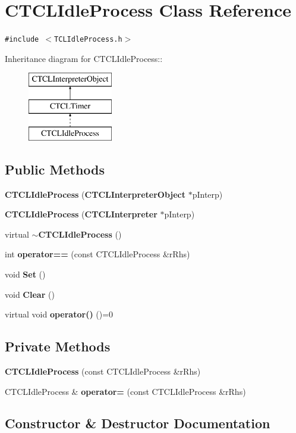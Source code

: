 \section{CTCLIdle\-Process  Class Reference}
\label{classCTCLIdleProcess}
{\tt \#include $<$TCLIdle\-Process.h$>$}

Inheritance diagram for CTCLIdle\-Process::\begin{figure}[H]
\begin{center}
\leavevmode
\includegraphics[height=3cm]{classCTCLIdleProcess}
\end{center}
\end{figure}
\subsection*{Public Methods}
\begin{CompactItemize}
\item 
{\bf CTCLIdle\-Process} ({\bf CTCLInterpreter\-Object} $\ast$p\-Interp)
\item 
{\bf CTCLIdle\-Process} ({\bf CTCLInterpreter} $\ast$p\-Interp)
\item 
virtual {\bf $\sim$CTCLIdle\-Process} ()
\item 
int {\bf operator==} (const CTCLIdle\-Process \&r\-Rhs)
\item 
void {\bf Set} ()
\item 
void {\bf Clear} ()
\item 
virtual void {\bf operator()} ()=0
\end{CompactItemize}
\subsection*{Private Methods}
\begin{CompactItemize}
\item 
{\bf CTCLIdle\-Process} (const CTCLIdle\-Process \&r\-Rhs)
\item 
CTCLIdle\-Process \& {\bf operator=} (const CTCLIdle\-Process \&r\-Rhs)
\end{CompactItemize}


\subsection{Constructor \& Destructor Documentation}
